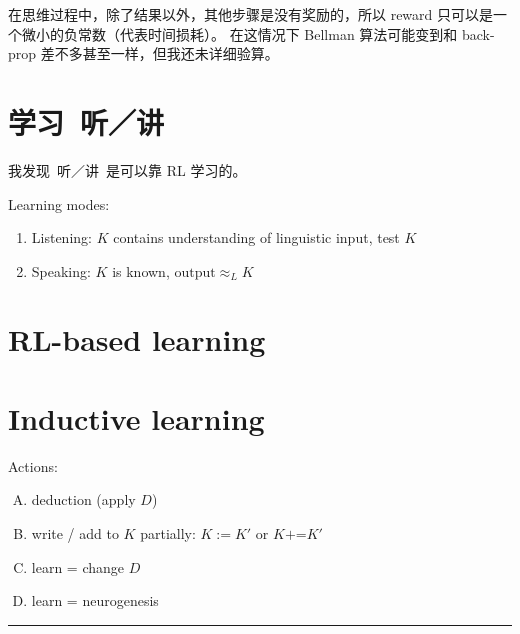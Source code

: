 \documentclass[12pt]{article}
\begin{document}
在思维过程中，除了结果以外，其他步骤是没有奖励的，所以 reward 只可以是一个微小的负常数（代表时间损耗）。 在这情况下 Bellman 算法可能变到和 back-prop 差不多甚至一样，但我还未详细验算。

\section{学习~听／讲}

我发现~听／讲~是可以靠 RL 学习的。

Learning modes:
\begin{enumerate}
\item Listening:  $K$ contains understanding of linguistic input, test $K$
\item Speaking:  $K$ is known, $\mbox{output} \approx_{L} K$
\end{enumerate}

\begin{center}
\end{center}

\section{RL-based learning}



\section{Inductive learning}

Actions:
\begin{enumerate}[(A)]
\item deduction (apply $D$)
\item write / add to $K$ partially:  $K := K'$ or $K \mbox{+=} K'$
\item learn = change $D$
\item learn = neurogenesis
\end{enumerate}


{\color{red}\rule{10cm}{2pt}}
\end{document}

